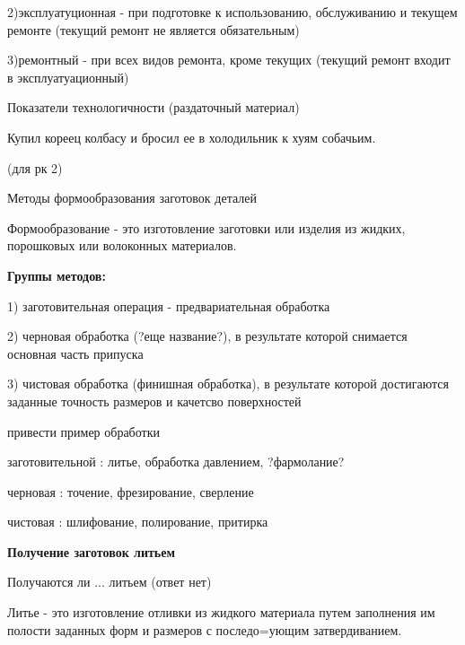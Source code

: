 {\begin{center}
    \par 2)эксплуатуционная - при подготовке к использованию, обслуживанию и текущем ремонте (текущий ремонт не является обязательным)

    \par 3)ремонтный - при всех видов ремонта, кроме текущих (текущий ремонт входит в эксплуатуационный)

    \par Показатели технологичности (раздаточный материал)


    \par Купил кореец колбасу и бросил ее в холодильник к хуям собачьим.

    \par (для рк 2)

    \par Методы формообразования заготовок деталей

    \par Формообразование - это изготовление заготовки или изделия из жидких, порошковых или волоконных материалов.

    \par \textbf{Группы методов:}

    \par 1) заготовительная операция - предвариательная обработка 

    \par 2) черновая обработка (?еще название?), в результате которой снимается основная часть припуска

    \par 3) чистовая обработка (финишная обработка), в результате которой достигаются заданные точность размеров и качетсво поверхностей 

    \par привести пример обработки

    \par заготовительной : литье, обработка давлением, ?фармолание?

    \par черновая : точение, фрезирование, сверление

    \par чистовая : шлифование, полирование, притирка

    \par \textbf{Получение заготовок литьем}

    \par Получаются ли ... литьем (ответ нет)

    \par Литье - это изготовление отливки из жидкого материала путем заполнения им полости заданных форм и размеров с последо=ующим затвердиванием. 


\end{center}}
